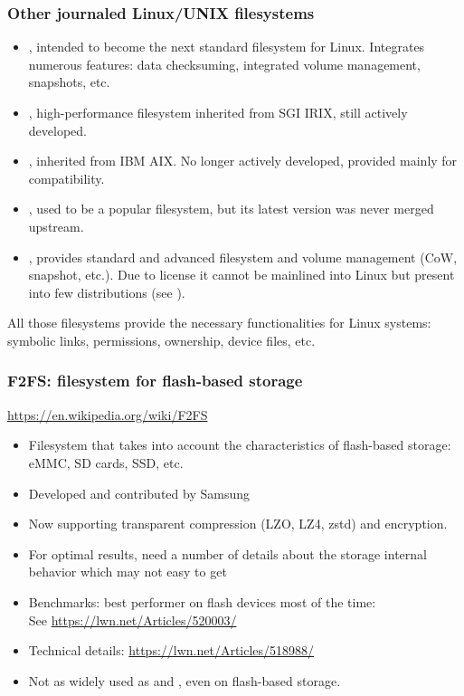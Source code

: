 \begin{frame}
  \frametitle{Other journaled Linux/UNIX filesystems}
  \begin{itemize}
  \item {}, intended to become the next standard filesystem
    for Linux. Integrates numerous features: data checksuming,
    integrated volume management, snapshots, etc.
  \item {}, high-performance filesystem inherited from SGI
    IRIX, still actively developed.
  \item {}, inherited from IBM AIX. No longer actively
    developed, provided mainly for compatibility.
  \item {}, used to be a popular filesystem, but its
    latest version  was never merged upstream.
  \item {}, provides standard and advanced filesystem and
    volume management (CoW, snapshot, etc.). Due to license it
    cannot be mainlined into Linux but present into few distributions
    (see ).
  \end{itemize}
  All those filesystems provide the necessary functionalities for
  Linux systems: symbolic links, permissions, ownership, device files,
  etc.
\end{frame}

\begin{frame}
  \frametitle{F2FS: filesystem for flash-based storage}
  \url{https://en.wikipedia.org/wiki/F2FS}
  \begin{itemize}
  \item Filesystem that takes into account the characteristics of
    flash-based storage: eMMC, SD cards, SSD, etc.
  \item Developed and contributed by Samsung
  \item Now supporting transparent compression (LZO, LZ4, zstd) and
        encryption.
  \item For optimal results, need a number of details about the
    storage internal behavior which may not easy to get
  \item Benchmarks: best performer on flash devices most of the time: \\
        See \url{https://lwn.net/Articles/520003/}
  \item Technical details: \url{https://lwn.net/Articles/518988/}
  \item Not as widely used as  and , even on flash-based
    storage.
  \end{itemize}
\end{frame}

